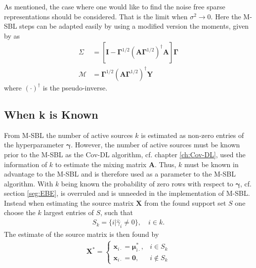 As mentioned, the case where one would like to find the noise free sparse representations should be considered. That is the limit when $\sigma^2\rightarrow 0$. Here the M-SBL steps can be adapted easily by using a modified version the moments, given by \cite[p.148]{phd_wipf} as 
\begin{align*}
\Sigma &= \left[ \textbf{I} - \boldsymbol{\Gamma}^{1/2} \left( \mathbf{A} \boldsymbol{\Gamma}^{1/2}\right)^{\dagger} \mathbf{A} \right]\boldsymbol{\Gamma}\\
\mathcal{M} &= \boldsymbol{\Gamma}^{1/2}\left( \mathbf{A} \boldsymbol{\Gamma}^{1/2}\right)^{\dagger} \mathbf{Y}
\end{align*} 
where $(\cdot)^{\dagger}$ is the pseudo-inverse.

\subsection{When k is Known}\label{subsec:kestimate}
From M-SBL the number of active sources $k$ is estimated as non-zero entries of the hyperparameter $\boldsymbol{\gamma}$.
However, the number of active sources must be known prior to the M-SBL as the Cov-DL algorithm, cf. chapter \ref{ch:Cov-DL}, used the information of $k$ to estimate the mixing matrix $\mathbf{A}$.
Thus, $k$ must be known in advantage to the M-SBL and is therefore used as a parameter to the M-SBL algorithm. 
With $k$ being known the probability of zero rows with respect to $\boldsymbol{\gamma}$, cf. section \ref{seg:EBE}, is overruled and is unneeded in the implementation of M-SBL.
Instead when estimating the source matrix $\mathbf{X}$ from the found support set $S$ one choose the $k$ largest entries of $S$, such that \cite[p. 3]{Balkan2014}
\begin{align*}
S_k = \{ i \vert \hat{\gamma}_i \neq 0 \}, \quad i \in k.
\end{align*}
The estimate of the source matrix is then found by
\begin{align*}
\mathbf{X}^\ast = 
\begin{cases}
\mathbf{x}_{i\cdot} = \boldsymbol{\mu}_{i \cdot}^\ast, & i \in S_k \\
\mathbf{x}_{i\cdot} = \mathbf{0}, & i \not \in S_k
\end{cases}
\end{align*}



